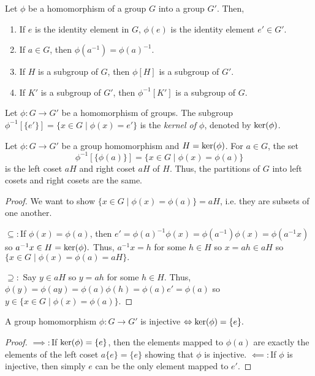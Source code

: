 \begin{theorem}
    Let $\phi$ be a homomorphism of a group $G$ into a group $G'$. Then,
    \begin{enumerate}
        \item If $e$ is the identity element in $G$, $\phi(e)$ is the identity element $e' \in G'$.
        \item If $a \in G$, then $\phi(a^{-1}) = \phi(a)^{-1}$.
        \item If $H$ is a subgroup of $G$, then $\phi[H]$ is a subgroup of $G'$.
        \item If $K'$ is a subgroup of $G'$, then $\phi^{-1}[K']$ is a subgroup of $G$.
    \end{enumerate}
\end{theorem}
\begin{definition}[Kernel]
    Let $\phi\colon G \to G'$ be a homomorphism of groups. The subgroup $\phi^{-1}[\{e'\}]=\{x\in G\mid \phi(x) = e'\}$ is the \emph{kernel of $\phi$}, denoted by $\operatorname{ker}(\phi)$.
\end{definition}
\begin{theorem}
    Let $\phi\colon G\to G'$ be a group homomorphism and $H = \operatorname{ker}(\phi)$. For $a \in G$, the set $$\phi^{-1}[\{\phi(a)\}]=\{x\in G\mid\phi(x)=\phi(a)\}$$ is the left coset $aH$ and right coset $aH$ of $H$. Thus, the partitions of $G$ into left cosets and right cosets are the same.
\end{theorem}
\begin{proof}
    We want to show $\{x \in G \mid \phi(x) = \phi(a)\} = aH$, i.e. they are subsets of one another.
    
    $\subseteq\colon$If $\phi(x) = \phi(a)$, then $e' = \phi(a)^{-1}\phi(x) = \phi(a^{-1})\phi(x) = \phi(a^{-1}x)$ so $a^{-1}x \in H = \operatorname{ker}(\phi).$ Thus, $a^{-1}x = h$ for some $h \in H$ so $x = ah \in aH$ so $\{x \in G \mid \phi(x) = \phi(a) = aH\}.$

    $\supseteq\colon$ Say $y \in aH$ so $y = ah$ for some $h \in H$. Thus, $\phi(y) = \phi(ay) = \phi(a)\phi(h) = \phi(a)e'=\phi(a)$ so $y \in \{x \in G \mid \phi(x) = \phi(a)\}.$
\end{proof}
\begin{corollary}
    A group homomorphism $\phi\colon G\to G'$ is injective $\Leftrightarrow \operatorname{ker}(\phi) = \{e\}.$
\end{corollary}
\begin{proof}
    $\implies\colon$If $\operatorname{ker}(\phi) = \{e\}$, then the elements mapped to $\phi(a)$ are exactly the elements of the left coset $a\{e\} = \{e\}$ showing that $\phi$ is injective.
    $\impliedby\colon$If $\phi$ is injective, then simply $e$ can be the only element mapped to $e'$. 
\end{proof}

